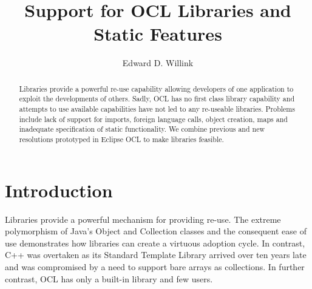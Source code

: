 \documentclass[sigconf]{acmart}
\begin{document}
\title{Support for OCL Libraries and Static Features}

\author{Edward D. Willink}


\begin{abstract}
  Libraries provide a powerful re-use capability allowing developers of one application to exploit the developments of others. Sadly, OCL has no first class library capability and attempts to use available capabilities have not led to any re-useable libraries. Problems include lack of support for imports, foreign language calls, object creation, maps and inadequate specification of static functionality. We combine previous and new resolutions prototyped in Eclipse OCL to make libraries feasible. 
\end{abstract}


\maketitle

\section{Introduction}\label{Introduction}
Libraries provide a powerful mechanism for providing re-use. The extreme polymorphism of Java's Object and Collection classes and the consequent ease of use demonstrates how libraries can create a virtuous adoption cycle. In contrast, C++ was overtaken as its Standard Template Library arrived over ten years late and was compromised by a need to support bare arrays as collections. In further contrast, OCL has only a built-in library and few users.
  
\end{document}
